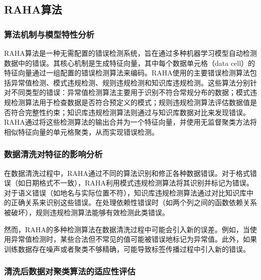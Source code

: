 \documentclass{ctexart} %
\begin{document}
\subsection{RAHA算法}

\subsubsection{算法机制与模型特性分析}

RAHA算法是一种无需配置的错误检测系统，旨在通过多种机器学习模型自动检测数据中的错误。其核心机制是生成特征向量，其中每个数据单元格（data cell）的特征向量通过一组配置的错误检测算法来编码。RAHA使用的主要错误检测算法包括异常值检测、模式违规检测、规则违规检测和知识库违规检测。这些算法分别针对不同类型的错误：异常值检测算法主要用于识别不符合常规分布的数据；模式违规检测算法用于检查数据是否符合预定义的模式；规则违规检测算法评估数据值是否符合完整性约束；知识库违规检测算法则通过与知识库数据对比来发现错误。RAHA通过将这些检测算法的输出合并为一个特征向量，并使用无监督聚类方法将相似特征向量的单元格聚类，从而实现错误检测。

\subsubsection{数据清洗对特征的影响分析}

在数据清洗过程中，RAHA通过不同的算法识别和修正各种数据错误。对于格式错误（如日期格式不一致），RAHA利用模式违规检测算法将其识别并标记为错误。对于语义错误（如地名与实际位置不符），知识库违规检测算法通过对比知识库中的正确关系来识别这些错误。在处理依赖性错误时（如两个列之间的函数依赖关系被破坏），规则违规检测算法能够有效检测此类错误。

然而，RAHA的多种检测算法在数据清洗过程中可能会引入新的误差。例如，当使用异常值检测时，某些合法但不常见的值可能被错误地标记为异常值。此外，如果训练数据存在噪声或者聚类不够精确，可能导致标签传播过程中引入新的错误。

\subsubsection{清洗后数据对聚类算法的适应性评估}
\end{document}
